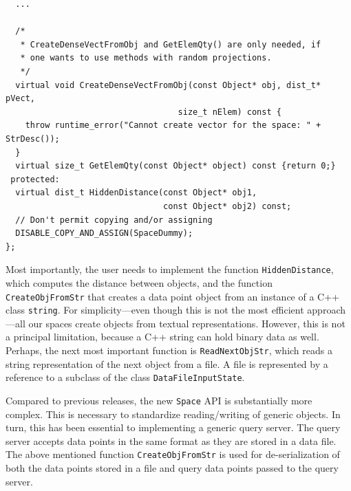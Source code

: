 \documentclass[runningheads,a4paper]{llncs}
\newcommand{\ttt}[1]{\texttt{#1}}
\begin{document}
\begin{table}
\begin{verbatim}
  ...

  /*
   * CreateDenseVectFromObj and GetElemQty() are only needed, if
   * one wants to use methods with random projections.
   */
  virtual void CreateDenseVectFromObj(const Object* obj, dist_t* pVect,
                                   size_t nElem) const {
    throw runtime_error("Cannot create vector for the space: " + StrDesc());
  }
  virtual size_t GetElemQty(const Object* object) const {return 0;}
 protected:
  virtual dist_t HiddenDistance(const Object* obj1, 
                                const Object* obj2) const;
  // Don't permit copying and/or assigning 
  DISABLE_COPY_AND_ASSIGN(SpaceDummy);
};
\end{verbatim}
\end{table}

Most importantly, the user needs to implement the function \ttt{HiddenDistance},
which computes the distance between objects,
and the function \ttt{CreateObjFromStr} that creates a data point object from an instance
of a C++ class \ttt{string}.
For simplicity---even though this is not the most efficient approach---all our spaces create
objects from textual representations. However, this is not a principal limitation,
because a C++ string can hold binary data as well.
Perhaps, the next most important function is \ttt{ReadNextObjStr}, 
which reads a string representation of the next object from a file. 
A file is represented by a reference to a subclass of the class \ttt{DataFileInputState}.

Compared to previous releases, the new \ttt{Space} API is substantially more complex.
This is necessary to standardize reading/writing of generic objects.
In turn, this has been essential to implementing a generic query server.
The query server accepts data points in the same format as they are stored in a data file.
The above mentioned function \ttt{CreateObjFromStr} is used for de-serialization
of both the data points stored in a file and query data points passed to the query server. 
\end{document}
